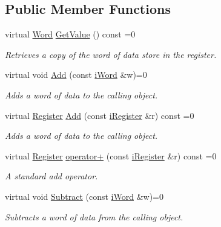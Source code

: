 \subsection*{Public Member Functions}
\begin{DoxyCompactItemize}
\item 
virtual \hyperlink{classWord}{Word} \hyperlink{classiRegister_ae7266f6f981b621f53f3c7cf77d4966a}{GetValue} () const =0
\begin{DoxyCompactList}\small\item\em Retrieves a copy of the word of data store in the register. \item\end{DoxyCompactList}\item 
virtual void \hyperlink{classiRegister_acb13aa880933f43088958723c9d6e564}{Add} (const \hyperlink{classiWord}{iWord} \&w)=0
\begin{DoxyCompactList}\small\item\em Adds a word of data to the calling object. \item\end{DoxyCompactList}\item 
virtual \hyperlink{classRegister}{Register} \hyperlink{classiRegister_abaaacfa8cb18bea90a78673bd572a1c8}{Add} (const \hyperlink{classiRegister}{iRegister} \&r) const =0
\begin{DoxyCompactList}\small\item\em Adds a word of data to the calling object. \item\end{DoxyCompactList}\item 
virtual \hyperlink{classRegister}{Register} \hyperlink{classiRegister_af8ab19234f44a0bade65cb35fd2cd036}{operator+} (const \hyperlink{classiRegister}{iRegister} \&r) const =0
\begin{DoxyCompactList}\small\item\em A standard add operator. \item\end{DoxyCompactList}\item 
virtual void \hyperlink{classiRegister_a98de346c2d0b15bee47d76bc5f70e94b}{Subtract} (const \hyperlink{classiWord}{iWord} \&w)=0
\begin{DoxyCompactList}\small\item\em Subtracts a word of data from the calling object. \item\end{DoxyCompactList}\item 

\end{DoxyCompactItemize}
